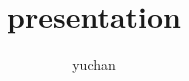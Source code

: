 \documentclass[dvipdfmx,11pt]{beamer}
\title{presentation}
\author{yuchan}
\begin{document}
\begin{frame}\frametitle{}
\titlepage
\end{frame}
\end{document}
